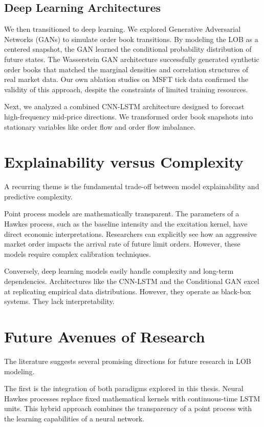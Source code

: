\subsection{Deep Learning Architectures}
We then transitioned to deep learning.
We explored Generative Adversarial Networks (GANs) to simulate order book transitions. By modeling the LOB as a centered snapshot, the GAN learned the conditional probability distribution of future states. The Wasserstein GAN architecture successfully generated synthetic order books that matched the marginal densities and correlation structures of real market data. Our own ablation studies on MSFT tick data confirmed the validity of this approach, despite the constraints of limited training resources.

Next, we analyzed a combined CNN-LSTM architecture designed to forecast high-frequency mid-price directions. We transformed  order book snapshots into stationary variables like order flow and order flow imbalance. 
\section{Explainability versus Complexity}

A recurring theme is the fundamental trade-off between model explainability and predictive complexity. 

Point process models are mathematically transparent. The parameters of a Hawkes process, such as the baseline intensity and the excitation kernel, have direct economic interpretations. Researchers can explicitly see how an aggressive market order impacts the arrival rate of future limit orders. However, these models require complex calibration techniques.

Conversely, deep learning models easily handle complexity and long-term dependencies. Architectures like the CNN-LSTM and the Conditional GAN excel at replicating empirical data distributions. However, they operate as black-box systems. They lack interpretability.

\section{Future Avenues of Research}

The literature suggests several promising directions for future research in LOB modeling. 

The first is the integration of both paradigms explored in this thesis. Neural Hawkes processes replace fixed mathematical kernels with continuous-time LSTM units. This hybrid approach combines the transparency of a point process with the learning capabilities of a neural network. 

